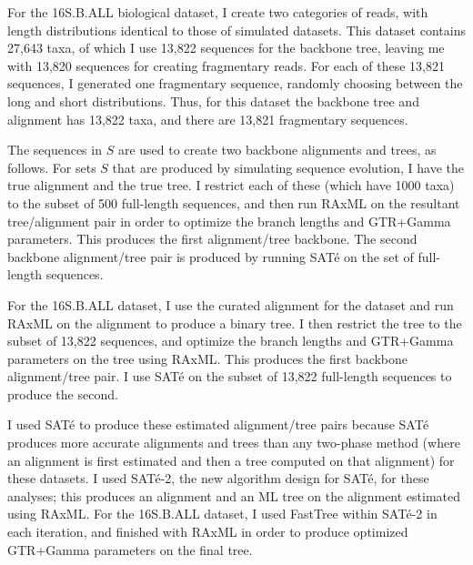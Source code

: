 For the 16S.B.ALL biological dataset, I create two categories of reads,
with length distributions identical to those of simulated datasets. 
This dataset contains 27,643 taxa, of which I use
13,822 sequences for the backbone tree, leaving me with 13,820 sequences
for creating fragmentary reads. 
For each of these
13,821 sequences, I generated one fragmentary sequence, 
randomly choosing between the long and
short distributions.  Thus, for 
this dataset the backbone tree and alignment has 13,822 taxa, and
there are 13,821 fragmentary sequences.

The sequences in $S$ are used to create two backbone alignments and
trees, as follows.
For sets $S$ that are produced by
simulating sequence evolution,  I have the true alignment and
the true tree.
I restrict each of these (which have 1000 taxa) to the subset of 500
full-length sequences, and then run RAxML
on the resultant tree/alignment pair in order to
optimize the branch lengths and GTR+Gamma parameters.   
This produces the first alignment/tree backbone.
The second backbone alignment/tree pair is produced by running
SAT\'{e} on the set of full-length sequences.

For the 16S.B.ALL dataset, I use the curated alignment for the
dataset and run RAxML on the alignment to produce a binary
tree.  I then 
restrict the tree to the subset of 13,822 sequences, and 
optimize the branch lengths and GTR+Gamma parameters on the tree
using RAxML.
This produces the first
backbone alignment/tree pair. I use
SAT\'{e} on the subset of 13,822 full-length sequences
to produce the second.

I used SAT\'{e} to produce these estimated alignment/tree pairs
because SAT\'{e} produces
more accurate alignments and trees than any two-phase method
(where an alignment is first estimated and then a tree
computed on that alignment)
for these datasets\cite{Liu2011}.
I used SAT\'{e}-2, the new algorithm design for SAT\'{e}, for
these analyses; this produces an alignment and an ML
tree on the alignment estimated using RAxML.
For the 16S.B.ALL dataset, I used FastTree\cite{Price2010}
within SAT\'{e}-2 in each iteration, and finished with
RAxML in order to produce optimized GTR+Gamma parameters on
the final tree.

